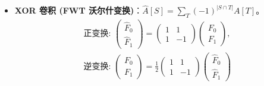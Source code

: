 \begin{itemize}
\[\begin{gathered}
    \text{逆变换: } \begin{pmatrix} F_0 \\ F_1 \end{pmatrix} = \begin{pmatrix} 1 & -1 \\ 0 & 1 \end{pmatrix} \begin{pmatrix} \hat{F}_0 \\ \hat{F}_1 \end{pmatrix}
    \end{gathered}
    \]
    \item \textbf{XOR 卷积 (FWT 沃尔什变换)}：$\hat{A}[S] = \sum_{T} (-1)^{|S \cap T|} A[T]$。
    \[ 
    \begin{gathered}
    \text{正变换: } \begin{pmatrix} \hat{F}_0 \\ \hat{F}_1 \end{pmatrix} = \begin{pmatrix} 1 & 1 \\ 1 & -1 \end{pmatrix} \begin{pmatrix} F_0 \\ F_1 \end{pmatrix}, \\
    \text{逆变换: } \begin{pmatrix} F_0 \\ F_1 \end{pmatrix} = \frac{1}{2} \begin{pmatrix} 1 & 1 \\ 1 & -1 \end{pmatrix} \begin{pmatrix} \hat{F}_0 \\ \hat{F}_1 \end{pmatrix}
    \end{gathered}
    \]
\end{itemize}

